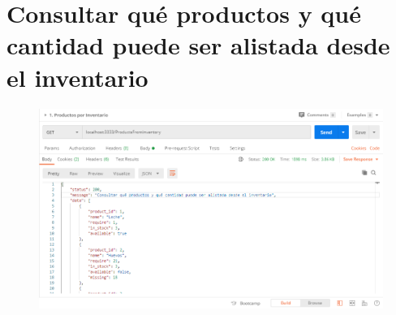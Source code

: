 \documentclass{article}
\begin{document}
\section{Consultar qué productos y qué cantidad puede ser alistada desde el inventario}
\begin{figure}[h!]
\centering
\includegraphics[scale=0.5]{1.png}
\end{figure}
\clearpage
\end{document}

